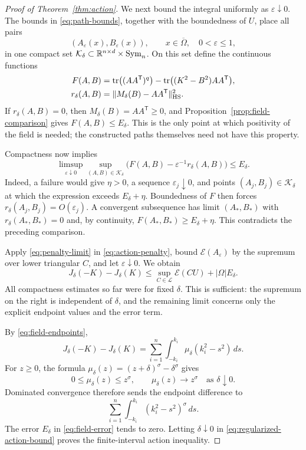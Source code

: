\begin{proof}[Proof of Theorem~\ref{thm:action}]
We next bound the integral uniformly as $\varepsilon\downarrow0$.
The bounds in \eqref{eq:path-bounds}, together with the boundedness of
$U$, place all pairs
\[
    (A_\varepsilon(x),B_\varepsilon(x)),
    \qquad x\in\overline\Omega,\quad0<\varepsilon\leq1,
\]
in one compact set $\mathcal K_\delta\subset
\mathbb R^{n\times d}\times\operatorname{Sym}_n$.  On this set define the continuous
functions
\begin{align*}
    F(A,B)&=\operatorname{tr}\bigl((AA^{\mathsf T})^q\bigr)
               -\operatorname{tr}\bigl((K^2-B^2)AA^{\mathsf T}\bigr),\\
    r_\delta(A,B)&=\|M_\delta(B)-AA^{\mathsf T}\|_{\mathrm{HS}}^2.
\end{align*}
If $r_\delta(A,B)=0$, then $M_\delta(B)=AA^{\mathsf T}\geq0$,
and Proposition~\ref{prop:field-comparison} gives $F(A,B)\leq E_\delta$.
This is the only point at which positivity of the field is needed;
the constructed paths themselves need not have this property.

Compactness now implies
\begin{equation}
\label{eq:penalty-limit}
    \limsup_{\varepsilon\downarrow0}
       \sup_{(A,B)\in\mathcal K_\delta}
          \bigl(F(A,B)-\varepsilon^{-1}r_\delta(A,B)\bigr)
       \leq E_\delta.
\end{equation}
Indeed, a failure would give $\eta>0$, a sequence
$\varepsilon_j\downarrow0$, and points $(A_j,B_j)\in\mathcal K_\delta$
at which the expression exceeds $E_\delta+\eta$.  Boundedness of $F$
then forces $r_\delta(A_j,B_j)=O(\varepsilon_j)$.  A convergent
subsequence has limit $(A_*,B_*)$ with $r_\delta(A_*,B_*)=0$ and,
by continuity, $F(A_*,B_*)\geq E_\delta+\eta$.  This contradicts
the preceding comparison.

Apply \eqref{eq:penalty-limit} in \eqref{eq:action-penalty}, bound
$\mathcal E(A_\varepsilon)$ by the supremum over lower triangular
$C$, and let $\varepsilon\downarrow0$.  We obtain
\begin{equation}
\label{eq:regularized-action-bound}
    J_\delta(-K)-J_\delta(K)
       \leq\sup_{C\in\mathcal L}\mathcal E(CU)
                       +|\Omega|E_\delta.
\end{equation}
All compactness estimates so far were for fixed $\delta$.  This is
sufficient: the supremum on the right is independent of $\delta$,
and the remaining limit concerns only the explicit endpoint values
and the error term.

By \eqref{eq:field-endpoints},
\[
    J_\delta(-K)-J_\delta(K)
       =\sum_{i=1}^n\int_{-k_i}^{k_i}
               \mu_\delta(k_i^2-s^2)\,ds.
\]
For $z\geq0$, the formula
$\mu_\delta(z)=(z+\delta)^\sigma-\delta^\sigma$ gives
\[
    0\leq\mu_\delta(z)\leq z^\sigma,
    \qquad \mu_\delta(z)\longrightarrow z^\sigma
            \quad\text{as }\delta\downarrow0.
\]
Dominated convergence therefore sends the endpoint difference to
\[
    \sum_{i=1}^n\int_{-k_i}^{k_i}(k_i^2-s^2)^\sigma\,ds.
\]
The error $E_\delta$ in \eqref{eq:field-error} tends to zero.  Letting
$\delta\downarrow0$ in \eqref{eq:regularized-action-bound} proves
the finite-interval action inequality.
\end{proof}
